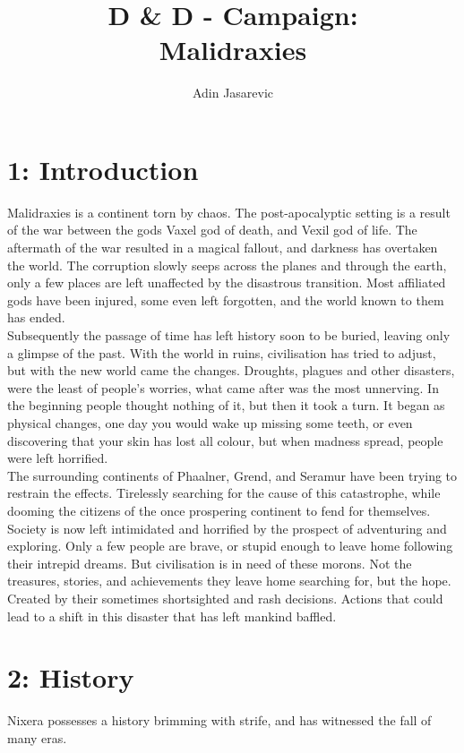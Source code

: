 \documentclass[a4paper]{article}
\title{D \& D - Campaign: \\ Malidraxies}
\author{Adin Jasarevic}
\begin{document}
\begin{titlepage}
\maketitle
\end{titlepage}
\makeatletter
\renewcommand\thesection{}
\renewcommand\thesubsection{\@arabic\c@section.\@arabic\c@subsection}
\makeatother
\section{1: Introduction}
Malidraxies is a continent torn by chaos. The post-apocalyptic setting is a result of the war between the gods Vaxel god of death, and Vexil god of life. The aftermath of the war resulted in a magical fallout, and darkness has overtaken the world. The corruption slowly seeps across the planes and through the earth, only a few places are left unaffected by the disastrous transition. Most affiliated gods have been injured, some even left forgotten, and the world known to them has ended.\\ Subsequently the passage of time has left history soon to be buried, leaving only a glimpse of the past. With the world in ruins, civilisation has tried to adjust, but with the new world came the changes. Droughts, plagues and other disasters, were the least of people's worries, what came after was the most unnerving. In the beginning people thought nothing of it, but then it took a turn. It began as physical changes, one day you would wake up missing some teeth, or even discovering that your skin has lost all colour, but when madness spread, people were left horrified.\\
The surrounding continents of Phaalner, Grend, and Seramur have been trying to restrain the effects. Tirelessly searching for the cause of this catastrophe, while dooming the citizens of the once prospering continent to fend for themselves.\\
Society is now left intimidated and horrified by the prospect of adventuring and exploring. Only a few people are brave, or stupid enough to leave home following their intrepid dreams. But civilisation is in need of these morons. Not the treasures, stories, and achievements they leave home searching for, but the hope. Created by their sometimes shortsighted and rash decisions. Actions that could lead to a shift in this disaster that has left mankind baffled.
\newpage
\tableofcontents
\newpage

\section{2: History}
Nixera possesses a history brimming with strife, and has witnessed the fall of many eras.
\end{document}
